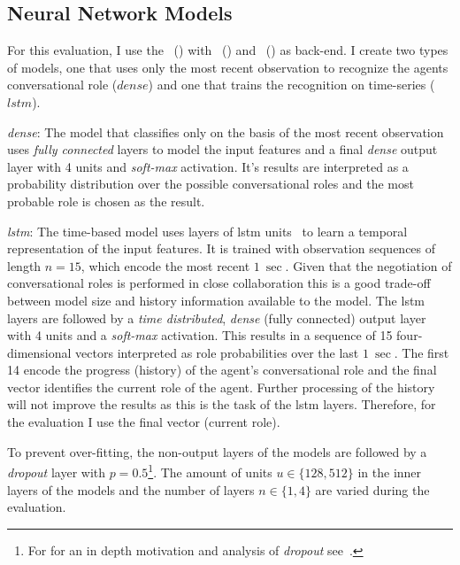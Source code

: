 \subsection{Neural Network Models}

For this evaluation, I use the~ () with~ () and~ () as back-end.
I create two types of models, one that uses only the most recent observation to recognize the agents \gls{conversational role} (\(dense\)) and one that trains the recognition on time-series (\(lstm\)).
\begin{description}
    \item{\emph{dense}:} The model that classifies only on the basis of the most recent observation uses \emph{fully connected} layers to model the input features and a final \emph{dense} output layer with 4 units and \emph{soft-max} activation.
    It's results are interpreted as a probability distribution over the possible \glspl{conversational role} and the most probable role is chosen as the result.
    \item{\emph{lstm}:} The time-based model uses layers of \gls{lstm} units~\cite{Hochreiter1997} to learn a temporal representation of the input features.
    It is trained with observation sequences of length \(n=15\), which encode the most recent \(\SI{1}{\sec}\).
    Given that the negotiation of \glspl{conversational role} is performed in close collaboration this is a good trade-off between model size and history information available to the model.
    The \gls{lstm} layers are followed by a \emph{time distributed}, \emph{dense} (fully connected) output layer with 4 units and a \emph{soft-max} activation.
    This results in a sequence of 15 four-dimensional vectors interpreted as role probabilities over the last \(\SI{1}{\sec}\).
    The first 14 encode the progress (history) of the agent's \gls{conversational role} and the final vector identifies the current role of the agent.
    Further processing of the history will not improve the results as this is the task of the \gls{lstm} layers.
    Therefore, for the evaluation I use the final vector (current role).
\end{description}
To prevent over-fitting, the non-output layers of the models are followed by a \emph{dropout} layer with \(p=0.5\)\footnote{For for an in depth motivation and analysis of \emph{dropout} see~.}.
The amount of units \(u \in \{128,512\} \) in the inner layers of the models and the number of layers \(n \in \{1,4\}\) are varied during the evaluation. 
